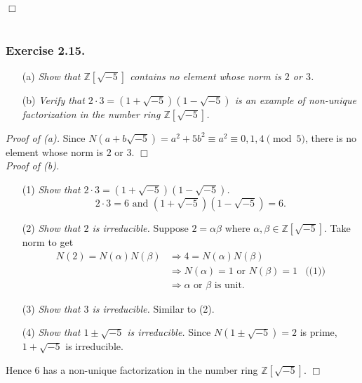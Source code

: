\documentclass{article}
\begin{document}
$\Box$ \\\\






\subsubsection*{Exercise 2.15.}
\begin{enumerate}
\item[(a)]
\emph{Show that $\mathbb{Z}[\sqrt{-5}]$ contains no element whose norm is $2$ or $3$.}
\item[(b)]
\emph{Verify that $2 \cdot 3 = (1+\sqrt{-5})(1-\sqrt{-5})$ is an example
of non-unique factorization in the number ring $\mathbb{Z}[\sqrt{-5}]$.} \\
\end{enumerate}

\emph{Proof of (a).}
Since $N(a+b\sqrt{-5}) = a^2 + 5b^2 \equiv a^2 \equiv 0,1,4 \pmod{5}$,
there is no element whose norm is $2$ or $3$.
$\Box$ \\

\emph{Proof of (b).}
\begin{enumerate}
\item[(1)]
  \emph{Show that $2 \cdot 3 = (1+\sqrt{-5})(1-\sqrt{-5})$.}
  $$2 \cdot 3 = 6 \text{ and } (1+\sqrt{-5})(1-\sqrt{-5}) = 6.$$

\item[(2)]
  \emph{Show that $2$ is irreducible.}
  Suppose $2 = \alpha\beta$ where $\alpha, \beta \in \mathbb{Z}[\sqrt{-5}]$.
  Take norm to get
  \begin{align*}
    N(2) = N(\alpha)N(\beta)
    &\Longrightarrow
    4 = N(\alpha)N(\beta) \\
    &\Longrightarrow
    N(\alpha) = 1 \text{ or } N(\beta) = 1
      &\text{((1))} \\
    &\Longrightarrow
    \text{$\alpha$ or $\beta$ is unit}.
  \end{align*}

\item[(3)]
  \emph{Show that $3$ is irreducible.}
  Similar to (2).

\item[(4)]
  \emph{Show that $1 \pm \sqrt{-5}$ is irreducible.}
  Since $N(1 \pm \sqrt{-5}) = 2$ is prime, $1+\sqrt{-5}$ is irreducible.
\end{enumerate}
Hence $6$ has a non-unique factorization
in the number ring $\mathbb{Z}[\sqrt{-5}]$.
$\Box$ \\\\
\end{document}
